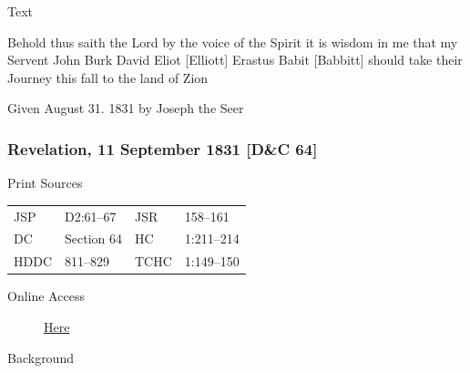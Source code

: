 {			\begin{description}
				\item[Text]
			\end{description}
			
				Behold thus saith the Lord by the voice of the Spirit it is wisdom in me that my Servent John Burk David Eliot [Elliott] Erastus Babit [Babbitt] should take their Journey this fall to the land of Zion
				
				\begin{tightright}
				Given August 31. 1831 by Joseph the Seer
				\end{tightright}
				
		\subsubsection{Revelation, 11 September 1831 [D\&C 64]}
			\label{EMS-1831-JS-11-SEP-1831}
		
			\begin{description}
				\item[Print Sources]
			\end{description}

				\begin{tabular}{p{0.5in}p{1in}p{0.5in}p{1in}}
				JSP	 	& D2:61--67		& JSR 		& 158--161 \\
				DC	 	& Section 64 	& HC 		& 1:211--214 \\
				HDDC 	& 811--829		& TCHC 		& 1:149--150 \\
				\end{tabular}
			
			\begin{description}
				\item[Online Access] \href{https://www.josephsmithpapers.org/paper-summary/revelation-11-september-1831-dc-64/1}{Here}
			\end{description}
			
			\begin{description}
				\item[Background]
			\end{description}
			
			
}

